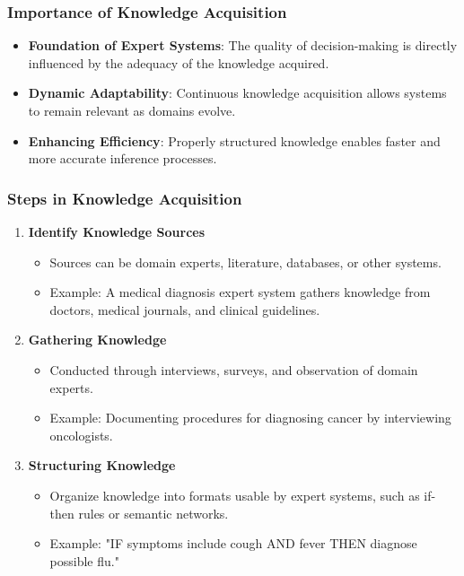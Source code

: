 \documentclass[aspectratio=169]{beamer}
\begin{document}
\begin{frame}[fragile]
    \frametitle{Importance of Knowledge Acquisition}
    \begin{itemize}
        \item \textbf{Foundation of Expert Systems}: The quality of decision-making is directly influenced by the adequacy of the knowledge acquired.
        \item \textbf{Dynamic Adaptability}: Continuous knowledge acquisition allows systems to remain relevant as domains evolve.
        \item \textbf{Enhancing Efficiency}: Properly structured knowledge enables faster and more accurate inference processes.
    \end{itemize}
\end{frame}

\begin{frame}[fragile]
    \frametitle{Steps in Knowledge Acquisition}
    \begin{enumerate}
        \item \textbf{Identify Knowledge Sources}
        \begin{itemize}
            \item Sources can be domain experts, literature, databases, or other systems. 
            \item Example: A medical diagnosis expert system gathers knowledge from doctors, medical journals, and clinical guidelines.
        \end{itemize}
        
        \item \textbf{Gathering Knowledge}
        \begin{itemize}
            \item Conducted through interviews, surveys, and observation of domain experts. 
            \item Example: Documenting procedures for diagnosing cancer by interviewing oncologists.
        \end{itemize}

        \item \textbf{Structuring Knowledge}
        \begin{itemize}
            \item Organize knowledge into formats usable by expert systems, such as if-then rules or semantic networks.
            \item Example: "IF symptoms include cough AND fever THEN diagnose possible flu."
        \end{itemize}
        

\end{enumerate}
\end{frame}
\end{document}
